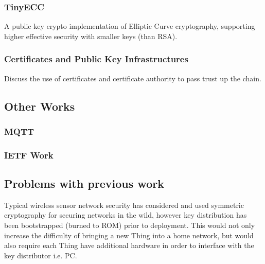 \documentclass{mprop}
\begin{document}
\subsubsection{TinyECC} %
\label{ssub:tinyecc}
\cite{TinyECC}
A public key crypto implementation of Elliptic Curve cryptography, supporting higher effective security with smaller keys (than RSA).


\subsubsection{Certificates and Public Key Infrastructures} %
\label{ssub:certificates_and_public_key_infrastructures}
Discuss the use of certificates and certificate authority to pass trust up the chain.


\subsection{Other Works} %
\label{sub:other_works}
\subsubsection{MQTT} %
\label{ssub:mqtt}

\subsubsection{IETF Work} %
\label{ssub:ietf_work}
\cite{IETF_COAP_HTTP, IETF_CORE}

\subsection{Problems with previous work} %
\label{sub:problems_with_previous_work}

Typical wireless sensor network security has considered and used symmetric cryptography\cite{TinySec,luk2007minisec, ContikiSec} for securing networks in the wild, however key distribution has been bootstrapped (burned to ROM) prior to deployment. This would not only increase the difficulty of bringing a new Thing into a home network, but would also require each Thing have additional hardware in order to interface with the key distributor i.e. PC. 
\end{document}
